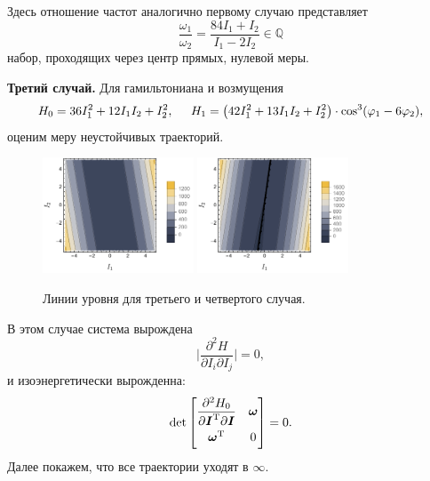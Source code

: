 Здесь отношение частот аналогично первому случаю представляет
\begin{equation*}
    \frac{\omega_1}{\omega_2} = \frac{84 I_1 + I_2}{I_1 - 2 I_2} \in \mathbb{Q}
\end{equation*}
набор, проходящих через центр прямых, нулевой меры. 


\textbf{Третий случай.} Для гамильтониана и возмущения
\begin{equation*}
    H_0 = 36 I_1^2 + 12 I_1 I_2 + I_2^2,
    \hspace{5 mm} 
    H_1 = \left(42 I_1^2 + 13 I_1 I_2 + I_2^2\right) \cdot \cos^3(\varphi_1-6 \varphi_2),
\end{equation*}
оценим меру неустойчивых траекторий. 

\begin{figure}[h]
    \centering
    \includegraphics[width=0.4\textwidth]{figures/H3.pdf}
    \hspace{10 mm} 
    \includegraphics[width=0.4\textwidth]{figures/H4.pdf}
    \caption{Линии уровня для третьего и четвертого случая.}
\end{figure}



В этом случае система вырождена
\begin{equation*}
        \bigg| \frac{\partial^2 H}{\partial I_i \partial I_j} \bigg| = 0,
\end{equation*}
и изоэнергетически вырожденна:
\begin{equation*}
         \det \begin{bmatrix}
        \vphantom{\dfrac{1}{2}}
            \dfrac{\partial^2 H_0}{\partial \vc{I}\T \partial \vc{I}} & \vc{\omega} \\
        \vphantom{\dfrac{1}{2}}
            \vc{\omega}\T & 0
        \end{bmatrix}  = 0.
\end{equation*}
Далее покажем, что все траектории уходят в $\infty$.


